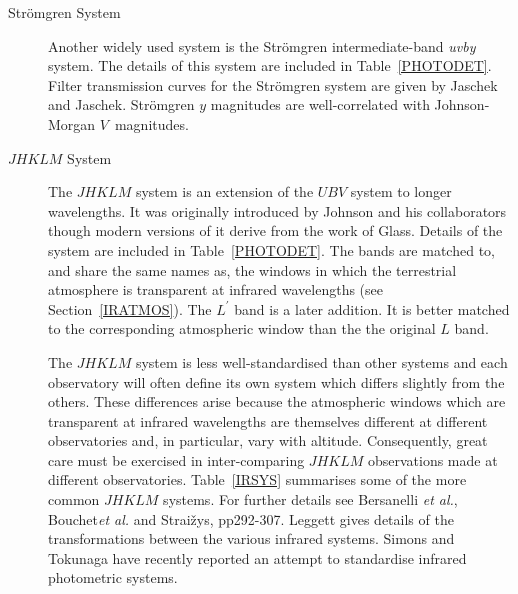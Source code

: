 \documentclass[twoside,11pt]{article}
\begin{document}
\begin{description}
  \item[Str\"{o}mgren System] Another widely used system is the Str\"{o}mgren
   intermediate-band {\it uvby}\, system\cite{STROMGREM63, STROMGREM66}.  The
   details of this system are included in Table~\ref{PHOTODET}.  Filter
   transmission curves for the Str\"{o}mgren system are given by Jaschek and
   Jaschek\cite{JASCHEK87}.  Str\"{o}mgren $y$ magnitudes are well-correlated
   with Johnson-Morgan $V$\, magnitudes.

  \item[$JHKLM$ System] The $JHKLM$ system is an extension of the
   $UBV$ system to longer wavelengths.  It was originally introduced by
   Johnson and his collaborators though modern versions of it derive
   from the work of Glass\cite{GLASS74}.  Details of the system are
   included in Table~\ref{PHOTODET}.  The bands are matched to, and share
   the same names as, the windows in which the terrestrial atmosphere is
   transparent at infrared wavelengths (see Section~\ref{IRATMOS}).  The
   $L^{\prime}$ band is a later addition.  It is better matched to the
   corresponding atmospheric window than the the original $L$ band.

   The $JHKLM$ system is less well-standardised than other systems and
   each observatory will often define its own system which differs slightly
   from the others.  These differences arise because the atmospheric
   windows which are transparent at infrared wavelengths are themselves
   different at different observatories and, in particular, vary with
   altitude.  Consequently, great care must be exercised in inter-comparing
   $JHKLM$ observations made at different observatories.
   Table~\ref{IRSYS} summarises some of the more common $JHKLM$ systems.
   For further details see Bersanelli {\it et al.}\/\cite{BERSANELLI91},
   Bouchet{\it et al.}\/\cite{BOUCHET91} and Strai\v{z}ys\cite{STRAIZYS92},
   pp292-307.  Leggett\cite{LEGGETT92} gives details of the transformations
   between the various infrared systems.  Simons and Tokunaga\cite{SIMONS01}
   have recently reported an attempt to standardise infrared photometric
   systems.

  \begin{table}[htbp]


\end{table}
\end{description}
\end{document}
